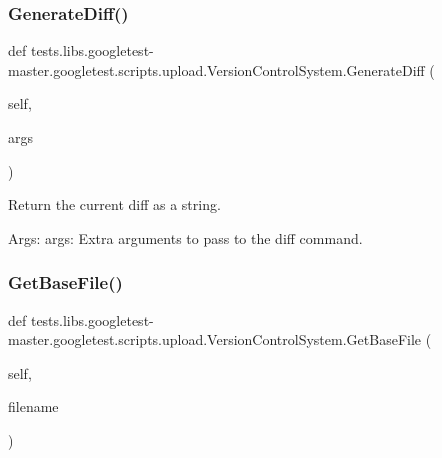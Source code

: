 \subsubsection{\texorpdfstring{Generate\+Diff()}{GenerateDiff()}}
{\footnotesize\ttfamily def tests.\+libs.\+googletest-\/master.\+googletest.\+scripts.\+upload.\+Version\+Control\+System.\+Generate\+Diff (\begin{DoxyParamCaption}\item[{}]{self,  }\item[{}]{args }\end{DoxyParamCaption})}

\begin{DoxyVerb}Return the current diff as a string.

Args:
  args: Extra arguments to pass to the diff command.
\end{DoxyVerb}
 \mbox{\label{classtests_1_1libs_1_1googletest-master_1_1googletest_1_1scripts_1_1upload_1_1VersionControlSystem_a350c3254e2b03d54539d46d4be9b1bbc}} 
\subsubsection{\texorpdfstring{Get\+Base\+File()}{GetBaseFile()}}
{\footnotesize\ttfamily def tests.\+libs.\+googletest-\/master.\+googletest.\+scripts.\+upload.\+Version\+Control\+System.\+Get\+Base\+File (\begin{DoxyParamCaption}\item[{}]{self,  }\item[{}]{filename }\end{DoxyParamCaption})}

